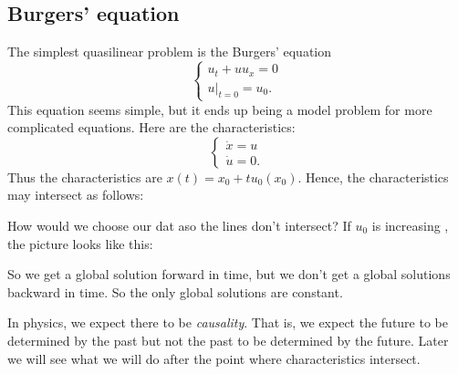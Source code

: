 \subsection{Burgers' equation}
\begin{example}
     The simplest quasilinear problem is the Burgers' equation 
    \[
        \begin{cases}
            u_t+uu_x = 0\\
            u|_{t=0} = u_0.
        \end{cases}
    \]
    This equation seems simple, but it ends up being a model problem for more complicated
equations. Here are the characteristics:
    \[
        \begin{cases}
            \dot x = u\\
            \dot u =0.
        \end{cases}
    \]
    Thus the characteristics are $x(t) = x_0 + tu_0(x_0)$. Hence, the characteristics may intersect as follows: 
    \begin{figure}[H]
        \centering
        \end{figure}

    How would we choose our dat aso the lines don't intersect? If $u_0$ is increasing , the picture looks like this: 
    \begin{figure}[H]
        \centering
        \end{figure}
    So we get a global solution forward in time, but we don't get a global solutions backward in time. So the only global solutions are constant.
\end{example}

\begin{remark}
    In physics, we expect there to be {\it causality}. That is, we expect the future to be determined by the past but not the past to be determined by the future. Later we will see what we will do after the point where characteristics intersect.
\end{remark}

